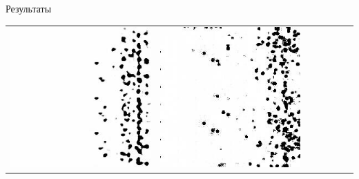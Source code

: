 \documentclass[12pt]{beamer}
\begin{document}
\begin{frame}{Результаты}
\begin{table}
\begin{center}
\begin{tabular}{p{1.2cm} p{1.2cm} p{1.2cm} p{1.2cm} p{1.2cm} p{1.2cm} p{1.2cm}}
					\includegraphics[width=1\linewidth]{8-results/sand-trend2/nf16_woUnet/gen2}
					&
					\includegraphics[width=1\linewidth]{8-results/sand-trend2/nf32/gen2}
					\\

\end{tabular}
\end{center}
\end{table}
\end{frame}
\end{document}
